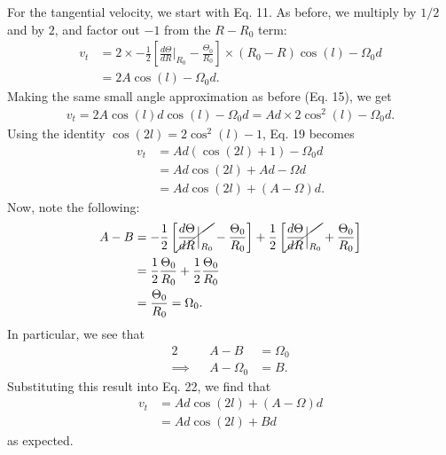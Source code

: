 \documentclass[11pt,letterpaper]{article}
\begin{document}
\begin{enumerate}[label=(\alph*)]
        For the tangential velocity, we start with Eq. 11. As before, we multiply by $1/2$ and by $2$, and factor out $-1$ from the $R-R_0$ term:
        \begin{align}
            v_t &= 2\times -\frac{1}{2}\left[\frac{d\Theta}{dR}\Big|_{R_0} - \frac{\Theta_0}{R_0}\right]\times(R_0-R)\cos(l) - \Omega_0 d \\
            &= 2A\cos(l) - \Omega_0 d.
        \end{align}
        Making the same small angle approximation as before (Eq. 15), we get 
        \begin{align}
            v_t = 2A\cos(l)d\cos(l) - \Omega_0 d = Ad\times 2\cos^2(l) - \Omega_0 d.
        \end{align}
        Using the identity $\cos(2l) = 2\cos^2(l) - 1$, Eq. 19 becomes
        \begin{align}
            v_t &= Ad(\cos(2l) + 1) - \Omega_0 d \\
            &= Ad\cos(2l) + Ad - \Omega d \\
            &= Ad\cos(2l) + (A - \Omega)d.
        \end{align}
        Now, note the following:
        \begin{align}
            A - B &= -\frac{1}{2}\left[\cancel{\frac{d\Theta}{dR}\Big|_{R_0}} - \frac{\Theta_0}{R_0}\right] + \frac{1}{2}\left[\cancel{\frac{d\Theta}{dR}\Big|_{R_0}} + \frac{\Theta_0}{R_0}\right] \\
            &= \frac{1}{2}\frac{\Theta_0}{R_0} + \frac{1}{2}\frac{\Theta_0}{R_0} \\ 
            &= \frac{\Theta_0}{R_0} = \Omega_0.
        \end{align}
        In particular, we see that 
        \begin{alignat}{2}
            &&A - B &= \Omega_0 \\
            \implies&&A - \Omega_0 &= B.
        \end{alignat}
        Substituting this result into Eq. 22, we find that 
        \begin{align}
            v_t &= Ad\cos(2l) + (A - \Omega)d \\
            &= Ad\cos(2l) + Bd
        \end{align}
        as expected.

\end{enumerate}
\end{document}
